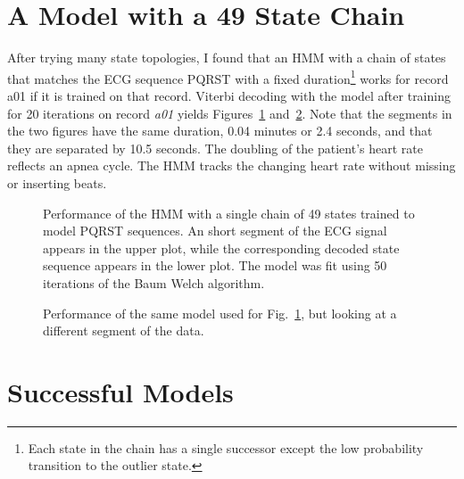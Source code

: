 \documentclass[12pt]{article}
\begin{document}
\section{A Model with a 49 State Chain}
\label{sec:mono20}

After trying many state topologies, I found that an HMM with a chain
of states that matches the ECG sequence PQRST with a fixed
duration\footnote{Each state in the chain has a single successor
  except the low probability transition to the outlier state.}
works for record a01 if it is trained on that record.  Viterbi
decoding with the model after training for 20 iterations on record
\emph{a01} yields Figures~\ref{fig:dict_states_70}
and~\ref{fig:dict_states_71}.  Note that the segments in the two
figures have the same duration, 0.04 minutes or 2.4 seconds, and that
they are separated by 10.5 seconds.  The doubling of the patient's
heart rate reflects an apnea cycle.  The HMM tracks the changing heart
rate without missing or inserting beats.

\begin{figure}
  \centering
    \caption{Performance of the HMM with a single chain of 49 states
      trained to model PQRST sequences.  An short segment of the ECG
      signal appears in the upper plot, while the corresponding
      decoded state sequence appears in the lower plot.  The model was
      fit using 50 iterations of the Baum Welch algorithm.}
  \label{fig:dict_states_70}
\end{figure}

\begin{figure}
  \centering
  \caption{Performance of the same model used for
    Fig.~\ref{fig:dict_states_70}, but looking at a different
    segment of the data.}
  \label{fig:dict_states_71}
\end{figure}

\section{Successful Models}
\label{sec:successful_models}
\end{document}
